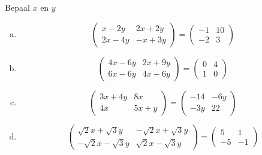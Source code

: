 \documentclass[12pt,twoside]{article}
\begin{document}
\begin{oefening}
Bepaal $x$ en $y$
\begin{enumerate}[(a)]
  \item
$$\begin{pmatrix}
  x-2y  & 2x+2y\\
  2x-4y & -x+3y
\end{pmatrix}
=
\begin{pmatrix}
  -1 & 10\\
  -2 & 3
\end{pmatrix}$$
  \item
$$\begin{pmatrix}
  4x-6y  & 2x+9y\\
  6x-6y & 4x-6y
\end{pmatrix}
=
\begin{pmatrix}
  0 & 4\\
  1 & 0
\end{pmatrix}$$
  \item
$$\begin{pmatrix}
  3x+4y  & 8x\\
  4x & 5x+y
\end{pmatrix}
=
\begin{pmatrix}
  -14 & -6y\\
  -3y & 22
\end{pmatrix}$$
  \item
$$\begin{pmatrix}
  \sqrt{2}x+\sqrt{3}y  & -\sqrt{2}x+\sqrt{3}y \\
  -\sqrt{2}x-\sqrt{3}y  & \sqrt{2}x-\sqrt{3}y
\end{pmatrix}
=
\begin{pmatrix}
  5 & 1\\
  -5 & -1
\end{pmatrix}$$
\end{enumerate}
\end{oefening}
\end{document}
